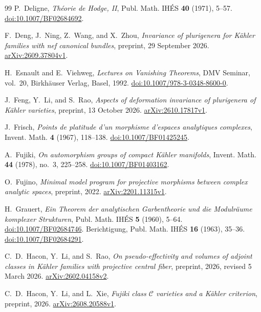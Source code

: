 \documentclass[11pt,a4paper]{article}
\numberwithin{equation}{section}
\theoremstyle{definition}
\theoremstyle{remark}
\begin{document}
\begin{thebibliography}{99}
P.~Deligne,
\emph{Théorie de Hodge, II},
Publ. Math. IHÉS \textbf{40} (1971), 5--57.
\href{https://doi.org/10.1007/BF02684692}{doi:10.1007/BF02684692}.

F.~Deng, J.~Ning, Z.~Wang, and X.~Zhou,
\emph{Invariance of plurigenera for Kähler families with nef canonical bundles},
preprint, 29 September 2026.
\href{https://arxiv.org/abs/2609.37804v1}{arXiv:2609.37804v1}.

H.~Esnault and E.~Viehweg,
\emph{Lectures on Vanishing Theorems},
DMV Seminar, vol.~20, Birkhäuser Verlag, Basel, 1992.
\href{https://doi.org/10.1007/978-3-0348-8600-0}{doi:10.1007/978-3-0348-8600-0}.

J.~Feng, Y.~Li, and S.~Rao,
\emph{Aspects of deformation invariance of plurigenera of Kähler varieties},
preprint, 13 October 2026.
\href{https://arxiv.org/abs/2610.17817v1}{arXiv:2610.17817v1}.

J.~Frisch,
\emph{Points de platitude d'un morphisme d'espaces analytiques complexes},
Invent. Math. \textbf{4} (1967), 118--138.
\href{https://doi.org/10.1007/BF01425245}{doi:10.1007/BF01425245}.

A.~Fujiki,
\emph{On automorphism groups of compact Kähler manifolds},
Invent. Math. \textbf{44} (1978), no.~3, 225--258.
\href{https://doi.org/10.1007/BF01403162}{doi:10.1007/BF01403162}.

O.~Fujino,
\emph{Minimal model program for projective morphisms between complex
analytic spaces}, preprint, 2022.
\href{https://arxiv.org/abs/2201.11315v1}{arXiv:2201.11315v1}.

H.~Grauert,
\emph{Ein Theorem der analytischen Garbentheorie und die Modulräume
komplexer Strukturen},
Publ. Math. IHÉS \textbf{5} (1960), 5--64.
\href{https://doi.org/10.1007/BF02684746}{doi:10.1007/BF02684746}.
Berichtigung, Publ. Math. IHÉS \textbf{16} (1963), 35--36.
\href{https://doi.org/10.1007/BF02684291}{doi:10.1007/BF02684291}.

C.~D.~Hacon, Y.~Li, and S.~Rao,
\emph{On pseudo-effectivity and volumes of adjoint classes in Kähler
families with projective central fiber},
preprint, 2026, revised 5 March 2026.
\href{https://arxiv.org/abs/2602.04158v2}{arXiv:2602.04158v2}.

C.~D.~Hacon, Y.~Li, and L.~Xie,
\emph{Fujiki class $\mathcal C$ varieties and a Kähler criterion},
preprint, 2026.
\href{https://arxiv.org/abs/2608.20588v1}{arXiv:2608.20588v1}.


\end{thebibliography}
\end{document}
